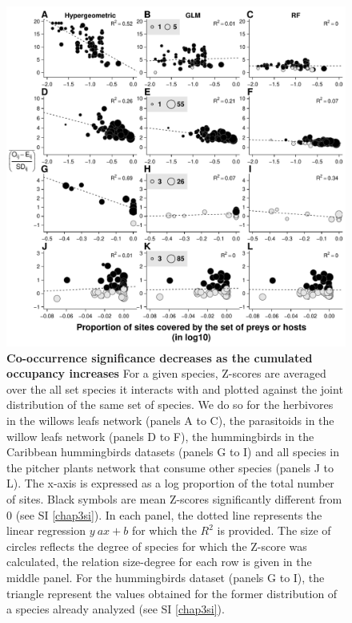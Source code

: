 \begin{figure}
\centering
\includegraphics{chapitre3/figdegocc.pdf}
\caption{\textbf{Co-occurrence significance decreases as the cumulated
occupancy increases} For a given species, Z-scores are averaged over the
all set species it interacts with and plotted against the joint
distribution of the same set of species. We do so for the herbivores in
the willows leafs network (panels A to C), the parasitoids in the willow
leafs network (panels D to F), the hummingbirds in the Caribbean
hummingbirds datasets (panels G to I) and all species in the pitcher
plants network that consume other species (panels J to L). The x-axis is
expressed as a log proportion of the total number of sites. Black
symbols are mean Z-scores significantly different from 0 (see SI
\ref{chap3si}). In each panel, the dotted line represents the linear
regression \(y~ax+b\) for which the \(R^2\) is provided. The size of
circles reflects the degree of species for which the Z-score was
calculated, the relation size-degree for each row is given in the middle
panel. For the hummingbirds dataset (panels G to I), the triangle
represent the values obtained for the former distribution of a species
already analyzed (see SI \ref{chap3si}).\label{fig:degocc}}
\end{figure}

\newpage

